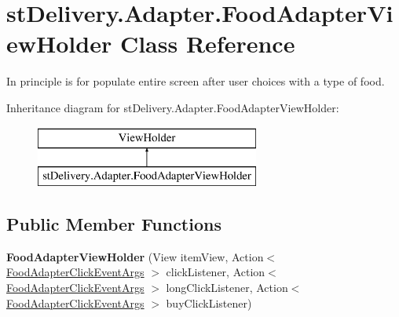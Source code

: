 \hypertarget{classst_delivery_1_1_adapter_1_1_food_adapter_view_holder}{}\section{st\+Delivery.\+Adapter.\+Food\+Adapter\+View\+Holder Class Reference}
\label{classst_delivery_1_1_adapter_1_1_food_adapter_view_holder}


In principle is for populate entire screen after user choices with a type of food.  


Inheritance diagram for st\+Delivery.\+Adapter.\+Food\+Adapter\+View\+Holder\+:\begin{figure}[H]
\begin{center}
\leavevmode
\includegraphics[height=2.000000cm]{classst_delivery_1_1_adapter_1_1_food_adapter_view_holder}
\end{center}
\end{figure}
\subsection*{Public Member Functions}
\begin{DoxyCompactItemize}
\item 
\mbox{\label{classst_delivery_1_1_adapter_1_1_food_adapter_view_holder_a4386c2a5eaeaf0511009cdb7fc230c25}} 
{\bfseries Food\+Adapter\+View\+Holder} (View item\+View, Action$<$ \hyperlink{classst_delivery_1_1_adapter_1_1_food_adapter_click_event_args}{Food\+Adapter\+Click\+Event\+Args} $>$ click\+Listener, Action$<$ \hyperlink{classst_delivery_1_1_adapter_1_1_food_adapter_click_event_args}{Food\+Adapter\+Click\+Event\+Args} $>$ long\+Click\+Listener, Action$<$ \hyperlink{classst_delivery_1_1_adapter_1_1_food_adapter_click_event_args}{Food\+Adapter\+Click\+Event\+Args} $>$ buy\+Click\+Listener)
\end{DoxyCompactItemize}
